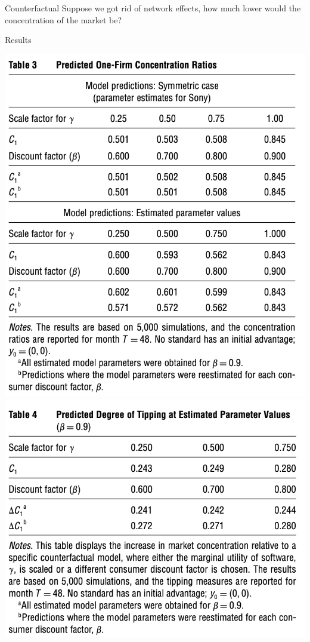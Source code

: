 \begin{frame}{Counterfactual}
Suppose we got rid of network effects, how much lower would the concentration of the market be?
\end{frame}

\begin{frame}{Results}
\begin{center}
\includegraphics[scale=0.65]{resources/dube-table3}
\includegraphics[scale=0.65]{resources/dube-table4}\\
\end{center}
\end{frame}

